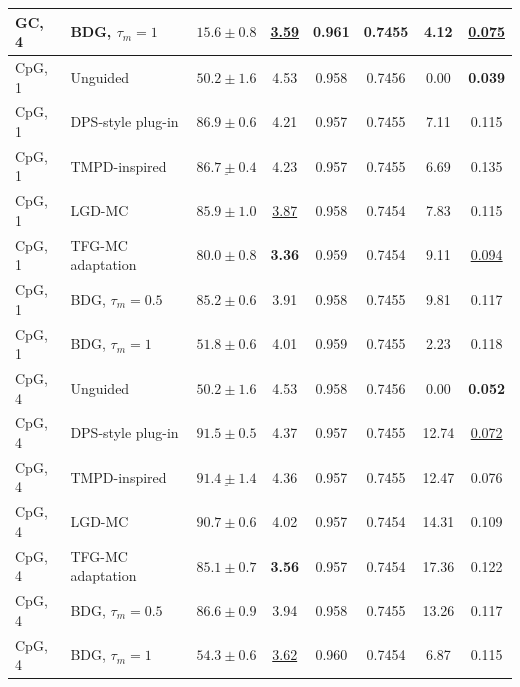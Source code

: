 \documentclass{article}
\begin{document}
\begin{table}[!htbp]
\begin{tabular}{llcccccc}
GC, 4 & BDG, $\tau_m=1$ & $15.6\pm0.8$ & \underline{3.59}& 0.961 & 0.7455 & 4.12 & \underline{0.075}\\
\midrule
CpG, 1 & Unguided & $50.2\pm1.6$ & 4.53 & 0.958 & 0.7456 & 0.00 & \textbf{0.039}\\
CpG, 1 & DPS-style plug-in & $\mathbf{86.9\pm0.6}$& 4.21 & 0.957 & 0.7455 & 7.11 & 0.115\\
CpG, 1 & TMPD-inspired & $\underline{86.7\pm0.4}$& 4.23 & 0.957 & 0.7455 & 6.69 & 0.135\\
CpG, 1 & LGD-MC & $85.9\pm1.0$ & \underline{3.87}& 0.958 & 0.7454 & 7.83 & 0.115\\
CpG, 1 & TFG-MC adaptation & $80.0\pm0.8$ & \textbf{3.36}& 0.959 & 0.7454 & 9.11 & \underline{0.094}\\
CpG, 1 & BDG, $\tau_m=0.5$ & $85.2\pm0.6$ & 3.91 & 0.958 & 0.7455 & 9.81 & 0.117\\
CpG, 1 & BDG, $\tau_m=1$ & $51.8\pm0.6$ & 4.01 & 0.959 & 0.7455 & 2.23 & 0.118\\
\midrule
CpG, 4 & Unguided & $50.2\pm1.6$ & 4.53 & 0.958 & 0.7456 & 0.00 & \textbf{0.052}\\
CpG, 4 & DPS-style plug-in & $\mathbf{91.5\pm0.5}$& 4.37 & 0.957 & 0.7455 & 12.74 & \underline{0.072}\\
CpG, 4 & TMPD-inspired & $\underline{91.4\pm1.4}$& 4.36 & 0.957 & 0.7455 & 12.47 & 0.076\\
CpG, 4 & LGD-MC & $90.7\pm0.6$ & 4.02 & 0.957 & 0.7454 & 14.31 & 0.109\\
CpG, 4 & TFG-MC adaptation & $85.1\pm0.7$ & \textbf{3.56}& 0.957 & 0.7454 & 17.36 & 0.122\\
CpG, 4 & BDG, $\tau_m=0.5$ & $86.6\pm0.9$ & 3.94 & 0.958 & 0.7455 & 13.26 & 0.117\\
CpG, 4 & BDG, $\tau_m=1$ & $54.3\pm0.6$ & \underline{3.62}& 0.960 & 0.7454 & 6.87 & 0.115\\
\bottomrule
\end{tabular}
\end{table}
\clearpage
\end{document}
